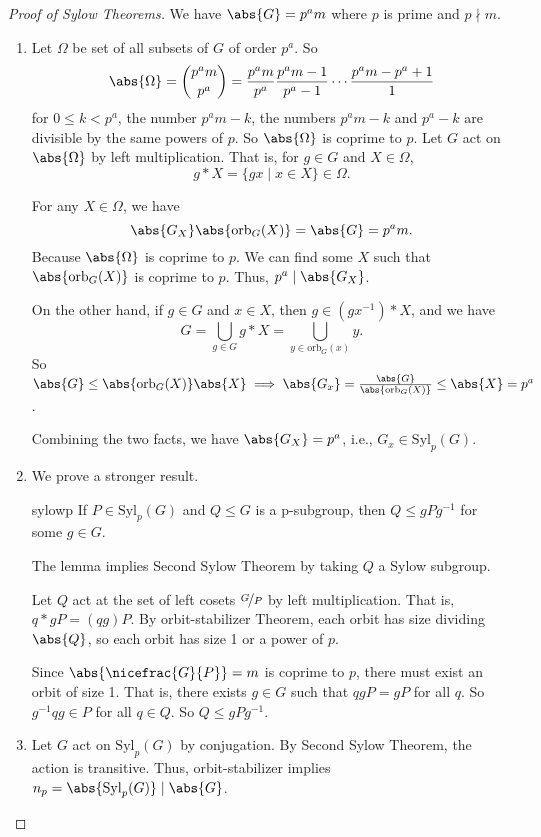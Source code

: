 \begin{proof}[Proof of Sylow Theorems]
    We have \(\abs{G} = p^a m\) where \(p\) is prime and \(p\nmid m\).
    \begin{enumerate}
        \item Let \(\Omega\) be set of all subsets of \(G\) of order \(p^a\). So
        \[
            \abs{\Omega} =\binom{p^a m}{p^a} = \frac{p^a m}{p^a} \frac{p^a m - 1}{p^a - 1}\cdots \frac{p^a m - p^a + 1}{1}
        \]
        for \(0 \leq k < p^a\), the number \(p^a m - k\), the numbers \(p^a m - k\) and \(p^a - k\) are divisible by the same powers of \(p\). So \(\abs{\Omega} \) is coprime to \(p\). Let \(G\) act on \(\abs{\Omega} \) by left multiplication. That is, for \(g \in G\) and \(X \in \Omega\),
        \[g * X = \{gx \mid x \in X\} \in \Omega.\]

        For any \(X \in \Omega\), we have
        \[
            \abs{G_X} \abs{\mathrm{orb}_G(X)} =\abs{G} =p^a m.
        \]
        Because \(\abs{\Omega} \) is coprime to \(p\). We can find some \(X\) such that \(\abs{\mathrm{orb}_G(X)} \) is coprime to \(p\). Thus, \(p^a \mid \abs{G_X} \).

        On the other hand, if \(g \in G\) and \(x \in X\), then \(g \in (gx^{-1})*X\), and we have
        \[
            G = \bigcup_{g\in G}g *X = \bigcup_{y\in \mathrm{orb}_G(x)}y.
        \]
        So \(\abs{G} \leq  \abs{\mathrm{orb}_G(X)} \abs{X}\implies \abs{G_x} = \frac{\abs{G}}{\abs{\mathrm{orb}_G(X)}} \leq \abs{X} =p^a \).

        Combining the two facts, we have \(\abs{G_X} =p^a\), i.e., \(G_x \in \mathrm{Syl}_p(G)\).
        \item We prove a stronger result.
        \begin{lemma}{}{sylowp}
            If \(P \in \mathrm{Syl}_p(G)\) and \(Q \leq G\) is a p-subgroup, then \(Q \leq gPg^{-1}\) for some \(g \in G\).
        \end{lemma}
        The lemma implies Second Sylow Theorem by taking \(Q\) a Sylow subgroup.

        Let \(Q\) act at the set of left cosets \(\nicefrac{G}{P}\) by left multiplication. That is, \(q * gP = (qg)P\). By orbit-stabilizer Theorem, each orbit has size dividing \(\abs{Q}\), so each orbit has size 1 or a power of \(p\).

        Since \(\abs{\nicefrac{G}{P}} = m\) is coprime to \(p\), there must exist an orbit of size 1. That is, there exists \(g \in G\) such that \(qgP = gP\) for all \(q\). So \(g^{-1}qg \in P\) for all \(q \in Q\). So \(Q \leq gPg^{-1}\).
        \item Let \(G\) act on \(\mathrm{Syl}_p(G)\) by conjugation. By Second Sylow Theorem, the action is transitive. Thus, orbit-stabilizer implies \(n_p = \abs{\mathrm{Syl}_p(G)}\mid \abs{G} \).


\end{enumerate}
\end{proof}
